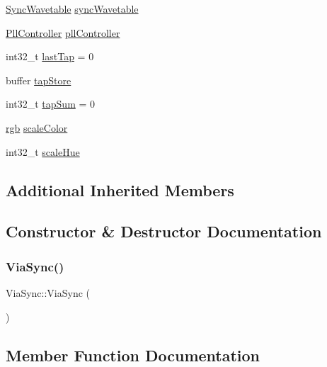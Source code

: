 \begin{DoxyCompactItemize}
\item 
\mbox{\hyperlink{class_sync_wavetable}{Sync\+Wavetable}} \mbox{\hyperlink{class_via_sync_a3a240ad9c0207533abecd6da64cfc069}{sync\+Wavetable}}
\item 
\mbox{\hyperlink{class_pll_controller}{Pll\+Controller}} \mbox{\hyperlink{class_via_sync_ac77f7c5b9fe24f61433f75ecaa702b87}{pll\+Controller}}
\item 
int32\+\_\+t \mbox{\hyperlink{class_via_sync_a38df99c334ee8b78ee921ec67052cb3d}{last\+Tap}} = 0
\item 
buffer \mbox{\hyperlink{class_via_sync_a49eb330e6b71d0519d44131cdee3ef24}{tap\+Store}}
\item 
int32\+\_\+t \mbox{\hyperlink{class_via_sync_aaf5f83216e823aba344592ad38a84e62}{tap\+Sum}} = 0
\item 
\mbox{\hyperlink{structrgb}{rgb}} \mbox{\hyperlink{class_via_sync_adaabb770098e4897fce63f29de6ce9e1}{scale\+Color}}
\item 
int32\+\_\+t \mbox{\hyperlink{class_via_sync_a2660c274695f43168b0f9f481304a320}{scale\+Hue}}
\end{DoxyCompactItemize}
\subsection*{Additional Inherited Members}


\subsection{Constructor \& Destructor Documentation}
\mbox{\label{class_via_sync_ac2661b7767cc423d2e97651cc75b04a3}} 
\subsubsection{\texorpdfstring{Via\+Sync()}{ViaSync()}}
{\footnotesize\ttfamily Via\+Sync\+::\+Via\+Sync (\begin{DoxyParamCaption}{ }\end{DoxyParamCaption})\hspace{0.3cm}{\ttfamily [inline]}}



\subsection{Member Function Documentation}
\mbox{\label{class_via_sync_a6c505fc93b2693b98d01b0bed50cff4a}} 
